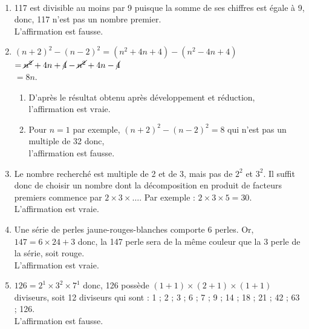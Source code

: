 \begin{corrige}
\ \\ [-5mm]
\begin{enumerate}
   \item 117 est divisible au moins par 9 puisque la somme de ses chiffres est égale à 9, donc, 117 n'est pas un nombre premier. \\
      {\blue L'affirmation est fausse}.
   \item 
      $(n+2)^2 - (n-2)^2 =(n^2+4n+4)-(n^2-4n+4)$ \\
      \hspace*{3.15cm} $=\cancel{n^2}+4n+\cancel{4}-\cancel{n^2}+4n-\cancel{4}$ \\
      \hspace*{3.15cm} $=8n$. \\
      \begin{enumerate}
         \item D'après le résultat obtenu après développement et réduction, \\
            {\blue l'affirmation est vraie}.
         \item Pour $n =1$ par exemple, $(n+2)^2 - (n-2)^2 =8$ qui n'est pas un multiple de 32 donc, \\
            {\blue l'affirmation est fausse}.
      \end{enumerate}
   \setcounter{enumi}{2}
   \item Le nombre recherché est multiple de 2 et de 3, mais pas de $2^2$ et $3^2$. Il suffit donc de choisir un nombre dont la décomposition en produit de facteurs premiers commence par $2\times3\times\dots$. Par exemple : $2\times3\times5 =30$. \\
      {\blue L'affirmation est vraie}.
   \item Une série de perles \og jaune-rouges-blanches \fg{} comporte 6 perles. Or, $147 =6\times24+3$ donc, la 147 perle sera de la même couleur que la 3 perle de la série, soit rouge. \\
      {\blue L'affirmation est vraie}.
   \item $126 =2^1\times3^2\times7^1$ donc, 126 possède $(1+1)\times(2+1)\times(1+1)$ diviseurs, soit 12 diviseurs qui sont : 1 ; 2 ; 3 ; 6 ; 7 ; 9 ; 14 ; 18 ; 21 ; 42 ; 63 ; 126. \\
      {\blue L'affirmation est fausse}.
\end{enumerate}
\end{corrige}


\bigskip


